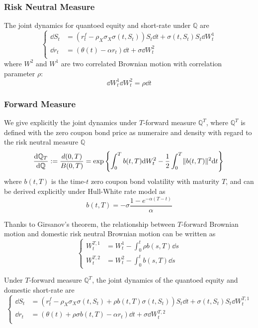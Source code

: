 \documentclass[11pt]{article}
\numberwithin{equation}{section}
\theoremstyle{remark}
\begin{document}
\subsubsection{Risk Neutral Measure}\label{2.4.1}
The joint dynamics for quantoed equity and short-rate under $\mathbb{Q}$ are
$$
\left\{
\begin{array}{ll}
    \dd S_t & = \left( r_t^f - \rho_X \sigma_X \sigma(t,S_t) \right) S_t \dd t + \sigma(t,S_t) S_t \dd W_t^1\\
    \dd r_t & = \left(\theta(t)-\alpha r_t \right) \dd t + \sigma \dd W_t^2\\
\end{array}
\right.
$$
where $W^2$ and $W^1$ are two correlated Brownian motion with correlation parameter $\rho$:
$$\dd W_t^1 \dd W_t^2 = \rho \dd t$$

\subsubsection{Forward Measure}\label{2.4.2}
We give explicitly the joint dynamics under $T$-forward measure $\mathbb{Q}^T$, where $\mathbb{Q}^T$ is defined with the zero coupon bond price as numeraire and density with regard to the risk neutral measure $\mathbb{Q}$
$$\frac{\dd\mathbb{Q}_T}{\dd\mathbb{Q}} := \frac{d(0,T)}{B(0,T)} = \text{exp}\left\{\int_0^Tb(t,T) \dd W_t^2 -\frac{1}{2}\int_0^T\lVert b(t,T)\rVert^2 \dd t \right\}\\$$
where $b(t, T)$ is the time-$t$ zero coupon bond volatility with maturity $T$, and can be derived explicitly under Hull-White rate model as
$$b(t,T) = -\sigma\frac{1-e^{-\alpha(T-t)}}{\alpha}$$

Thanks to Girsanov's theorem, the relationship between $T$-forward Brownian motion and domestic risk neutral Brownian motion can be written as
$$
\left\{
\begin{array}{ll}
    W_t^{T,1} &= W_t^1 - \int_0^t \rho b(s,T) \dd s\\
    W_t^{T,2} &= W_t^2 - \int_0^t b(s,T) \dd s
\end{array}
\right.
$$

Under $T$-forward measure $\mathbb{Q}^T$, the joint dynamics of the quantoed equity and domestic short-rate are
$$
\left\{
\begin{array}{ll}
    \dd S_t & = \left( r_t^f - \rho_X \sigma_X \sigma(t,S_t) + \rho b(t,T) \sigma(t,S_t) \right) S_t \dd t + \sigma(t,S_t) S_t \dd W_t^{T,1}\\
    \dd r_t & = \left(\theta(t) + \rho \sigma b(t,T) -\alpha r_t \right) \dd t + \sigma \dd W_t^{T,2}\\
\end{array}
\right.
$$
\end{document}
